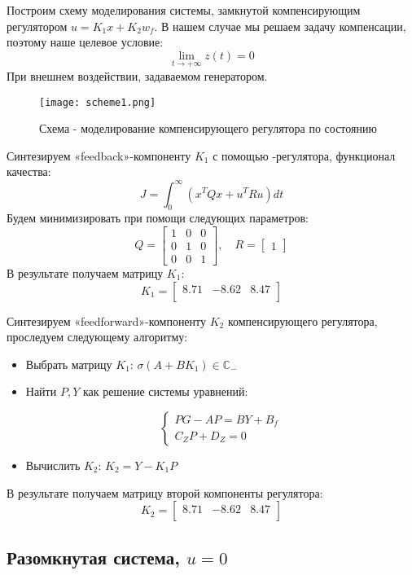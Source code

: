 Построим схему моделирования системы, замкнутой компенсирующим регулятором $u =K_1x+K_2w_f$. В нашем случае мы решаем задачу компенсации, поэтому наше целевое условие:
$$
  \lim_{t\to +\infty} z(t) = 0
$$
При внешнем воздействии, задаваемом генератором. 
\begin{figure}[ht]
  \centering
  \texttt{[image: scheme1.png]}
  \caption{Схема - моделирование компенсирующего регулятора по состоянию}
\end{figure}

Синтезируем «feedback»-компоненту $K_1$ с помощью -регулятора, функционал качества:
$$
  J = \int_0^{\infty} (x^TQx + u^TRu) dt
$$ 
Будем минимизировать при помощи следующих параметров:
$$
  Q = \begin{bmatrix}
    1 & 0 & 0 \\
    0 & 1 & 0 \\
    0 & 0 & 1
  \end{bmatrix}, \quad R = \begin{bmatrix}
    1
  \end{bmatrix}
$$
В результате получаем матрицу $K_1$:
$$
  K_1 = \begin{bmatrix}
    8.71 & -8.62 & 8.47 \\
\end{bmatrix}
$$

Синтезируем «feedforward»-компоненту $K_2$ компенсирующего регулятора, проследуем следующему алгоритму:
\begin{itemize}
  \item Выбрать матрицу $K_1$: $\sigma(A+BK_1)\in\mathbb{C}_{-}$
  \item Найти $P, Y$ как решение системы уравнений:
  
  $$
  \begin{cases}
    PG - AP = BY + B_f \\
    C_Z P + D_Z = 0
  \end{cases}
  $$

  \item Вычислить $K_2$: $K_2 = Y - K_1 P$
\end{itemize}
В результате получаем матрицу второй компоненты регулятора:
$$
  K_2 = \begin{bmatrix}
    8.71 & -8.62 & 8.47 \\
\end{bmatrix}
$$

\newpage
\subsection{Разомкнутая система, $u=0$}

